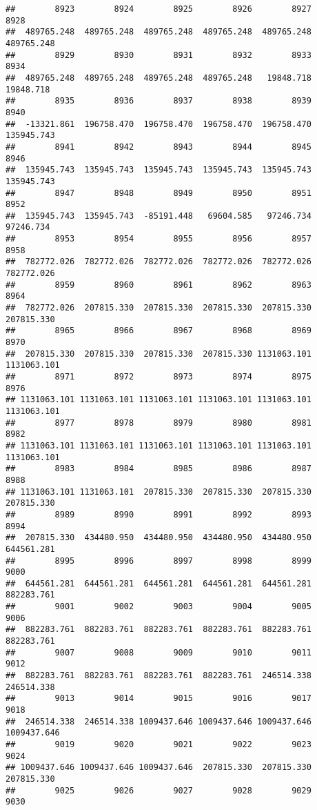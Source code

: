 \documentclass[
]{book}
\begin{document}
\begin{verbatim}
##        8923        8924        8925        8926        8927        8928 
##  489765.248  489765.248  489765.248  489765.248  489765.248  489765.248 
##        8929        8930        8931        8932        8933        8934 
##  489765.248  489765.248  489765.248  489765.248   19848.718   19848.718 
##        8935        8936        8937        8938        8939        8940 
##  -13321.861  196758.470  196758.470  196758.470  196758.470  135945.743 
##        8941        8942        8943        8944        8945        8946 
##  135945.743  135945.743  135945.743  135945.743  135945.743  135945.743 
##        8947        8948        8949        8950        8951        8952 
##  135945.743  135945.743  -85191.448   69604.585   97246.734   97246.734 
##        8953        8954        8955        8956        8957        8958 
##  782772.026  782772.026  782772.026  782772.026  782772.026  782772.026 
##        8959        8960        8961        8962        8963        8964 
##  782772.026  207815.330  207815.330  207815.330  207815.330  207815.330 
##        8965        8966        8967        8968        8969        8970 
##  207815.330  207815.330  207815.330  207815.330 1131063.101 1131063.101 
##        8971        8972        8973        8974        8975        8976 
## 1131063.101 1131063.101 1131063.101 1131063.101 1131063.101 1131063.101 
##        8977        8978        8979        8980        8981        8982 
## 1131063.101 1131063.101 1131063.101 1131063.101 1131063.101 1131063.101 
##        8983        8984        8985        8986        8987        8988 
## 1131063.101 1131063.101  207815.330  207815.330  207815.330  207815.330 
##        8989        8990        8991        8992        8993        8994 
##  207815.330  434480.950  434480.950  434480.950  434480.950  644561.281 
##        8995        8996        8997        8998        8999        9000 
##  644561.281  644561.281  644561.281  644561.281  644561.281  882283.761 
##        9001        9002        9003        9004        9005        9006 
##  882283.761  882283.761  882283.761  882283.761  882283.761  882283.761 
##        9007        9008        9009        9010        9011        9012 
##  882283.761  882283.761  882283.761  882283.761  246514.338  246514.338 
##        9013        9014        9015        9016        9017        9018 
##  246514.338  246514.338 1009437.646 1009437.646 1009437.646 1009437.646 
##        9019        9020        9021        9022        9023        9024 
## 1009437.646 1009437.646 1009437.646  207815.330  207815.330  207815.330 
##        9025        9026        9027        9028        9029        9030 

\end{verbatim}
\end{document}
